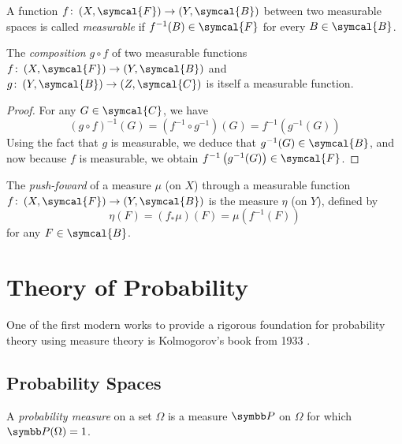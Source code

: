 \begin{definition}
A function \(f \colon \left(X, \symcal{F}\right) \to \left(Y, \symcal{B}\right)\) between two measurable spaces is called \emph{measurable} if \(f^{-1} (B) \in \symcal{F}\) for every \(B \in \symcal{B}\).
\end{definition}

\begin{proposition}
The \emph{composition} \(g \circ f\) of two measurable functions \(f \colon \left(X, \symcal{F}\right) \to \left(Y, \symcal{B}\right)\) and \(g \colon \left(Y, \symcal{B}\right) \to \left(Z, \symcal{C}\right)\) is itself a measurable function.
\end{proposition}
\begin{proof}
For any \(G \in \symcal{C}\), we have
\[
    \left(g \circ f\right)^{-1} (G) = \left(f^{-1} \circ g^{-1}\right) (G) = f^{-1} \left(g^{-1} (G)\right)
\]
Using the fact that \(g\) is measurable, we deduce that \(g^{-1} (G) \in \symcal{B}\), and now because \(f\) is measurable, we obtain \(f^{-1} \left(g^{-1} (G)\right) \in \symcal{F}\).
\end{proof}

\begin{definition}
The \emph{push-foward} of a measure \(\mu\) (on \(X\)) through a measurable function \(f \colon \left(X, \symcal{F}\right) \to \left(Y, \symcal{B}\right)\) is the measure \(\eta\) (on \(Y\)), defined by
\[
    \eta(F) = \left(f_{*} \mu\right) (F) = \mu \left(f^{-1} (F)\right)
\]
for any \(F \in \symcal{B}\).
\end{definition}

\section{Theory of Probability}

One of the first modern works to provide a rigorous foundation for probability theory using measure theory is Kolmogorov's book from 1933 \cite{Kolmogorov1933}.

\subsection*{Probability Spaces}

\begin{definition}
A \emph{probability measure} on a set \(\Omega\) is a measure \(\probability\) on \(\Omega\) for which \(\probability(\Omega) = 1\).
\end{definition}

